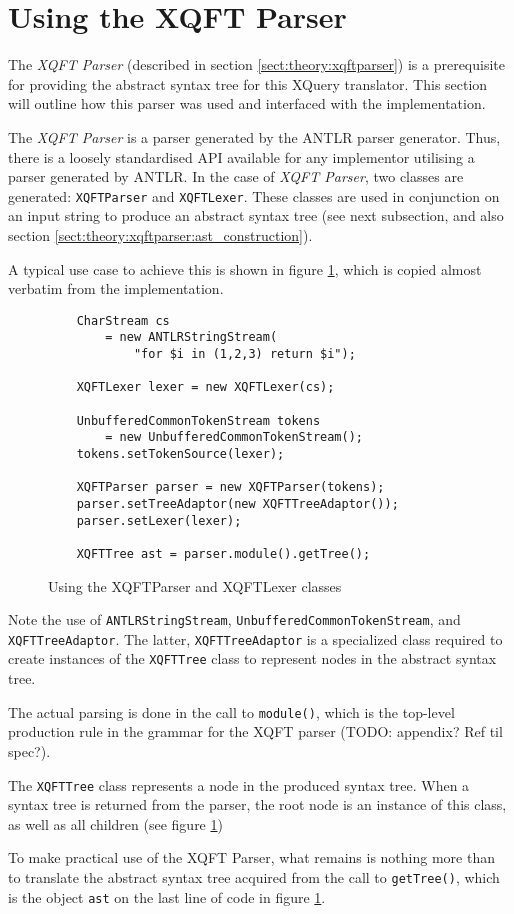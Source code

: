 \section{Using the XQFT Parser}
The \textit{XQFT Parser}\cite{ourselves} (described in section
\ref{sect:theory:xqftparser}) is a prerequisite for providing the abstract
syntax tree for this XQuery translator. This section will outline how this
parser was used and interfaced with the implementation.

The \textit{XQFT Parser} is a parser generated by the ANTLR parser generator.
Thus, there is a loosely standardised API available for any implementor
utilising a parser generated by ANTLR. In the case of \textit{XQFT Parser}, two
classes are generated: \texttt{XQFTParser} and \texttt{XQFTLexer}. These
classes are used in conjunction on an input string to produce an abstract syntax
tree (see next subsection, and also section
\ref{sect:theory:xqftparser:ast_construction}).

A typical use case to achieve this is shown in figure
\ref{figure:impl:using_xqft}, which is copied almost verbatim from the
implementation.

\begin{figure}[!htp]
\begin{center}
  \begin{Verbatim}
    CharStream cs 
        = new ANTLRStringStream(
            "for $i in (1,2,3) return $i");

    XQFTLexer lexer = new XQFTLexer(cs);

    UnbufferedCommonTokenStream tokens 
        = new UnbufferedCommonTokenStream();
	tokens.setTokenSource(lexer);

    XQFTParser parser = new XQFTParser(tokens);
    parser.setTreeAdaptor(new XQFTTreeAdaptor());
    parser.setLexer(lexer);

    XQFTTree ast = parser.module().getTree();
  \end{Verbatim}
  \caption{Using the XQFTParser and XQFTLexer classes}
  \label{figure:impl:using_xqft}
\end{center}
\end{figure}
Note the use of \texttt{ANTLRStringStream},
\texttt{UnbufferedCommonTokenStream}, and \texttt{XQFTTreeAdaptor}. The latter,
\texttt{XQFTTreeAdaptor} is a specialized class required to create instances of
the \texttt{XQFTTree} class to represent nodes in the abstract syntax tree.

The actual parsing is done in the call to \texttt{module()}, which is the
top-level production rule in the grammar for the XQFT parser (TODO: appendix?
Ref til spec?).

The \texttt{XQFTTree} class represents a node in the produced syntax tree. When
a syntax tree is returned from the parser, the root node is an instance of this
class, as well as all children (see figure \ref{figure:impl:using_xqft})

To make practical use of the XQFT Parser, what remains is nothing more than to
translate the abstract syntax tree acquired from the call to
\texttt{getTree()}, which is the object \texttt{ast} on the last line of code
in figure \ref{figure:impl:using_xqft}.
